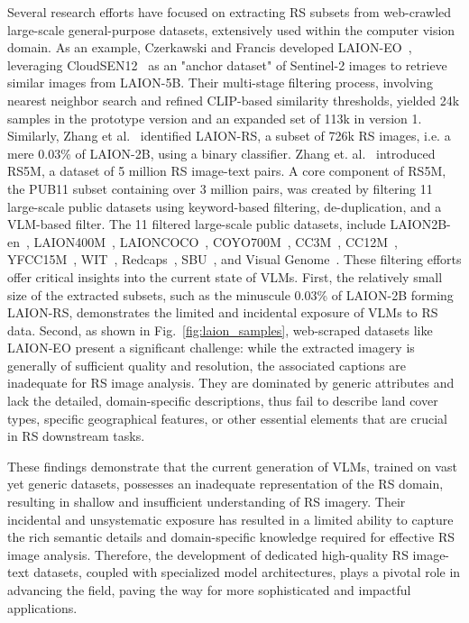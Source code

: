 Several research efforts have focused on extracting RS subsets from web-crawled large-scale general-purpose datasets, extensively used within the computer vision domain. As an example, Czerkawski and Francis developed LAION-EO~\cite{czerkawski2023laion}, leveraging CloudSEN12~\cite{aybar2022cloudsen12} as an "anchor dataset" of Sentinel-2 images to retrieve similar images from LAION-5B. Their multi-stage filtering process, involving nearest neighbor search and refined CLIP-based similarity thresholds, yielded 24k samples in the prototype version and an expanded set of 113k in version 1. Similarly, Zhang et al.~\cite{wang2024skyscript} identified LAION-RS, a subset of 726k RS images, i.e. a mere 0.03\% of LAION-2B, using a binary classifier. Zhang et. al.~\cite{zhang2024rs5m} introduced RS5M, a dataset of 5 million RS image-text pairs. A core component of RS5M, the PUB11 subset containing over 3 million pairs, was created by filtering 11 large-scale public datasets using keyword-based filtering, de-duplication, and a VLM-based filter. The 11 filtered large-scale public datasets, include LAION2B-en~\cite{schuhmann2022laion}, LAION400M~\cite{schuhmann2021laion}, LAIONCOCO~\cite{schuhmann2022laioncoco}, COYO700M~\cite{byeon2022coyo}, CC3M~\cite{sharma2018conceptual}, CC12M~\cite{changpinyo2021conceptual}, YFCC15M~\cite{thomee2016yfcc100m}, WIT~\cite{srinivasan2021wit}, Redcaps~\cite{desai2021redcaps}, SBU~\cite{ordonez2011im2text}, and Visual Genome~\cite{krishna2017visual}. These filtering efforts offer critical insights into the current state of VLMs. First, the relatively small size of the extracted subsets, such as the minuscule 0.03\% of LAION-2B forming LAION-RS, demonstrates the limited and incidental exposure of VLMs to RS data. Second, as shown in Fig.~\ref{fig:laion_samples}, web-scraped datasets like LAION-EO present a significant challenge: while the extracted imagery is generally of sufficient quality and resolution, the associated captions are inadequate for RS image analysis. They are dominated by generic attributes and lack the detailed, domain-specific descriptions, thus fail to describe land cover types, specific geographical features, or other essential elements that are crucial in RS downstream tasks.

These findings demonstrate that the current generation of VLMs, trained on vast yet generic datasets, possesses an inadequate representation of the RS domain, resulting in shallow and insufficient understanding of RS imagery. Their incidental and unsystematic exposure has resulted in a limited ability to capture the rich semantic details and domain-specific knowledge required for effective RS image analysis. Therefore, the development of dedicated high-quality RS image-text datasets, coupled with specialized model architectures, plays a pivotal role in advancing the field, paving the way for more sophisticated and impactful applications.

